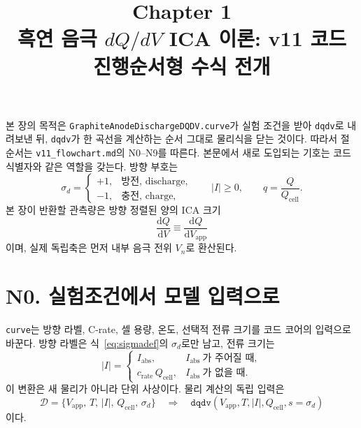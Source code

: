 \documentclass[11pt,a4paper]{article}
\title{\textbf{\LARGE Chapter 1}\\[0.35em]\Large 흑연 음극 $dQ/dV$ ICA 이론: v11 코드 진행순서형 수식 전개}
\author{}
\date{}
\newcommand{\dd}{\mathrm{d}}
\newcommand{\app}{\mathrm{app}}
\newcommand{\cell}{\mathrm{cell}}
\begin{document}
\maketitle
\tableofcontents
\newpage
\setcounter{section}{-1}

본 장의 목적은 \texttt{GraphiteAnodeDischargeDQDV.curve}가 실험 조건을 받아
\texttt{dqdv}로 내려보낸 뒤, \texttt{dqdv}가 한 곡선을 계산하는 순서 그대로 물리식을 닫는 것이다.
따라서 절 순서는 \texttt{v11\_flowchart.md}의 N0--N9를 따른다. 본문에서 새로 도입되는 기호는
코드 식별자와 같은 역할을 갖는다. 방향 부호는
\begin{equation}
\sigma_d=\begin{cases}
+1,&\text{방전, discharge},\\
-1,&\text{충전, charge},
\end{cases}
\qquad |I|\ge0,\qquad q=\frac{Q}{Q_{\cell}}.
\label{eq:sigmadef}
\end{equation}
본 장이 반환할 관측량은 방향 정렬된 양의 ICA 크기
\begin{equation}
\frac{\dd Q}{\dd V}\equiv \frac{\dd Q}{\dd V_{\app}}
\label{eq:targetdqdv}
\end{equation}
이며, 실제 독립축은 먼저 내부 음극 전위 $V_n$로 환산된다.

\section{N0. 실험조건에서 모델 입력으로}\label{sec:N0}
\texttt{curve}는 방향 라벨, C-rate, 셀 용량, 온도, 선택적 전류 크기를 코드 코어의 입력으로 바꾼다.
방향 라벨은 식~\eqref{eq:sigmadef}의 $\sigma_d$로만 남고, 전류 크기는
\begin{equation}
|I|=\begin{cases}
I_{\mathrm{abs}},& I_{\mathrm{abs}}\ \text{가 주어질 때},\\
c_{\mathrm{rate}}\,Q_{\cell},& I_{\mathrm{abs}}\ \text{가 없을 때}.
\end{cases}
\label{eq:Iabs}
\end{equation}
이 변환은 새 물리가 아니라 단위 사상이다. 물리 계산의 독립 입력은
\begin{equation}
\mathcal D=\{V_{\app},\,T,\,|I|,\,Q_{\cell},\,\sigma_d\}
\quad\Longrightarrow\quad
\texttt{dqdv}(V_{\app},T,|I|,Q_{\cell},s=\sigma_d)
\label{eq:inputset}
\end{equation}
이다.
\end{document}
